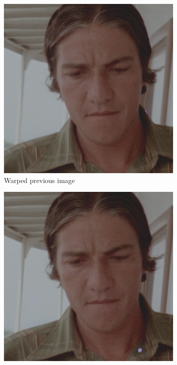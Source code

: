 \begin{figure}[H]
	\centering
	\begin{subfigure}{.3\textwidth}
		\centering
		\includegraphics[width=\linewidth]{warp/warpedPrevious.png}
		\caption[figure]{Warped previous image}
		\label{fig:warp_warpprev}
	\end{subfigure}
	\begin{subfigure}{.3\textwidth}
		\centering
		\includegraphics[width=\linewidth]{warp/input.png}

\end{subfigure}
\end{figure}

